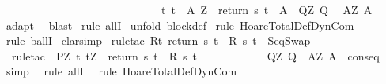 \begin{isabellebody}
\ \ \ \ \ \ \ \ \ \ \ \ \ \ \ \ \ \ \ \ \ \ \ \ \ \ \ \ \ {\isacharparenleft}{\isasymforall}t{\isachardot}\ t\ {\isasymin}\ A{\isacharprime}\ Z\ {\isasymlongrightarrow}\ return\ s\ t\ {\isasymin}\ A{\isacharparenright}{\isacharbraceright}{\isachardoublequoteclose}\ \ Q{\isacharprime}{\isacharequal}{\isachardoublequoteopen}{\isasymlambda}Z{\isachardot}\ Q{\isachardoublequoteclose}\ \ \isanewline
A{\isacharprime}{\isacharequal}{\isachardoublequoteopen}{\isasymlambda}Z{\isachardot}\ A{\isachardoublequoteclose}{\isacharbrackright}{\isacharparenright}\isanewline
{}\isamarkupfalse%
\ {}\isanewline
{}\isamarkupfalse%
\ adapt\isanewline
{}\isamarkupfalse%
\ \ blast\isanewline
{}\isamarkupfalse%
\ {\isacharparenleft}rule\ allI{\isacharparenright}\isanewline
{}\isamarkupfalse%
\ {\isacharparenleft}unfold\ block{\isacharunderscore}def{\isacharparenright}\isanewline
{}\isamarkupfalse%
\ {\isacharparenleft}rule\ HoareTotalDef{\isachardot}DynCom{\isacharparenright}\isanewline
{}\isamarkupfalse%
\ {\isacharparenleft}rule\ ballI{\isacharparenright}\isanewline
{}\isamarkupfalse%
\ clarsimp\isanewline
{}\isamarkupfalse%
\ {\isacharparenleft}rule{\isacharunderscore}tac\ R{\isacharequal}{\isachardoublequoteopen}{\isacharbraceleft}t{\isachardot}\ return\ s\ t\ {\isasymin}\ R\ s\ t{\isacharbraceright}{\isachardoublequoteclose}\ \ SeqSwap\ {\isacharparenright}\isanewline
{}\isamarkupfalse%
\ \ {\isacharparenleft}rule{\isacharunderscore}tac\ \ P{\isacharprime}{\isacharequal}{\isachardoublequoteopen}{\isasymlambda}Z{\isacharprime}{\isachardot}\ {\isacharbraceleft}t{\isachardot}\ t{\isacharequal}Z{\isacharprime}\ {\isasymand}\ return\ s\ t\ {\isasymin}\ R\ s\ t{\isacharbraceright}{\isachardoublequoteclose}\ \ \isanewline
\ \ \ \ \ \ \ \ \ \ Q{\isacharprime}{\isacharequal}{\isachardoublequoteopen}{\isasymlambda}Z{\isacharprime}{\isachardot}\ Q{\isachardoublequoteclose}\ \ A{\isacharprime}{\isacharequal}{\isachardoublequoteopen}{\isasymlambda}Z{\isacharprime}{\isachardot}\ A{\isachardoublequoteclose}\ \ conseq{\isacharparenright}\isanewline
{}\isamarkupfalse%
\ {}\ \isamarkupfalse%
\ simp\isanewline
{}\isamarkupfalse%
\ \ {\isacharparenleft}rule\ allI{\isacharparenright}\isanewline
{}\isamarkupfalse%
\ \ {\isacharparenleft}rule\ HoareTotalDef{\isachardot}DynCom{\isacharparenright}\isanewline

\end{isabellebody}
